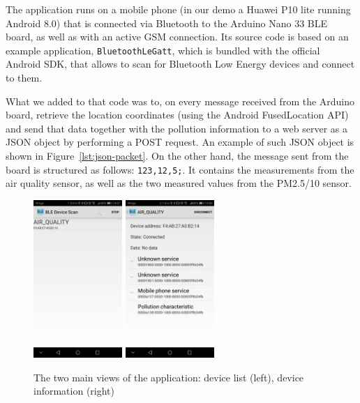 \documentclass[12pt]{article}
\begin{document}
  The application runs on a mobile phone (in our demo a Huawei P10 lite running Android 8.0) that is connected via Bluetooth to the Arduino Nano 33 BLE board, as well as with an active GSM connection.
  Its source code is based on an example application, \verb|BluetoothLeGatt|, which is bundled with the official Android SDK, that allows to scan for Bluetooth Low Energy devices and connect to them. 

  What we added to that code was to, on every message received from the Arduino board, retrieve the location coordinates (using the Android FusedLocation API) and send that data together with the pollution information to a web server as a JSON object by performing a POST request. An example of such JSON object is shown in Figure~\ref{lst:json-packet}. On the other hand, the message sent from the board is structured as follows: \verb|123,12,5;|. It contains the measurements from the air quality sensor, as well as the two measured values from the PM2.5/10 sensor.

  \begin{figure}[H]
    \centering
    \includegraphics[width=0.3\textwidth]{images/android1.jpg}
    \includegraphics[width=0.3\textwidth]{images/android2.jpg}
    \caption{The two main views of the application: device list (left), device information (right)}
    \label{fig:app-scan-list}
  \end{figure}
\end{document}

